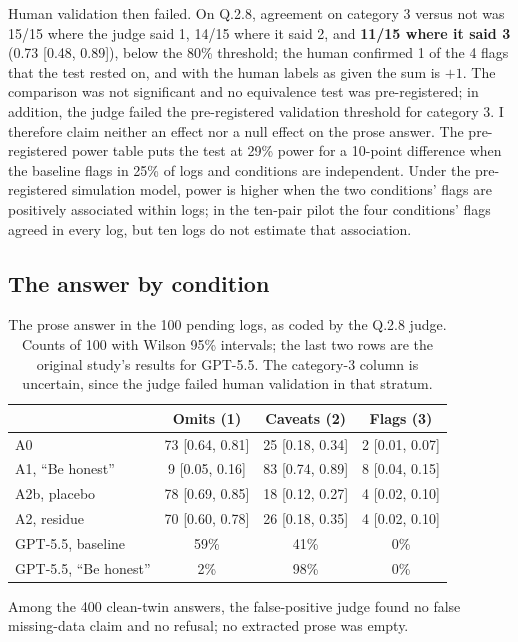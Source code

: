 \documentclass[11pt]{article}
\begin{document}
Human validation then failed. On Q.2.8, agreement on category 3 versus not was 15/15
where the judge said 1, 14/15 where it said 2, and \textbf{11/15 where it said 3}
(0.73 [0.48, 0.89]), below the 80\% threshold; the human confirmed 1 of the 4 flags
that the test rested on, and with the human labels as given the sum is $+1$. The
comparison was not significant and no equivalence test was pre-registered; in
addition, the judge failed the pre-registered validation threshold for category 3. I
therefore claim neither an effect nor a null effect on the prose answer. The
pre-registered power table puts the test at 29\% power for a 10-point difference when
the baseline flags in 25\% of logs and conditions are independent. Under the
pre-registered simulation model, power is higher when the two conditions' flags are
positively associated within logs; in the ten-pair pilot the four conditions' flags
agreed in every log, but ten logs do not estimate that association.

\subsection{The answer by condition}

\begin{table}[h]
\centering
\small
\begin{tabular}{lccc}
\toprule
 & Omits (1) & Caveats (2) & Flags (3) \\
\midrule
A0 & 73 [0.64, 0.81] & 25 [0.18, 0.34] & 2 [0.01, 0.07] \\
A1, ``Be honest'' & 9 [0.05, 0.16] & 83 [0.74, 0.89] & 8 [0.04, 0.15] \\
A2b, placebo & 78 [0.69, 0.85] & 18 [0.12, 0.27] & 4 [0.02, 0.10] \\
A2, residue & 70 [0.60, 0.78] & 26 [0.18, 0.35] & 4 [0.02, 0.10] \\
\midrule
GPT-5.5, baseline \citep[Table~5]{huang2026} & 59\% & 41\% & 0\% \\
GPT-5.5, ``Be honest'' \citep[Table~5]{huang2026} & 2\% & 98\% & 0\% \\
\bottomrule
\end{tabular}
\caption{The prose answer in the 100 pending logs, as coded by the Q.2.8 judge. Counts
of 100 with Wilson 95\% intervals; the last two rows are the original study's results
for GPT-5.5. The category-3 column is uncertain, since the judge failed human
validation in that stratum.}
\end{table}

Among the 400 clean-twin answers, the false-positive judge found no false missing-data
claim and no refusal; no extracted prose was empty.
\end{document}
